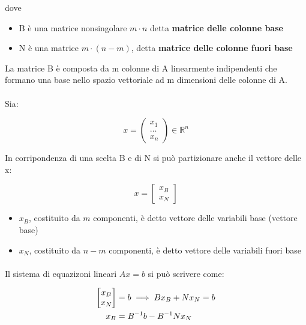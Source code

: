 \documentclass[a4paper, 11pt]{article}
\begin{document}
        dove 
        \begin{itemize}
            \item B è una matrice nonsingolare $m \cdot n$ detta \textbf{matrice delle colonne base}
            \item N è una matrice $m \cdot (n-m)$, detta \textbf{matrice delle colonne fuori base}
        \end{itemize}

        La matrice B è composta da m colonne di A linearmente indipendenti che formano 
        una base nello spazio vettoriale ad m dimensioni delle colonne di A.



        \paragraph{}
        Sia:


        \[
            x = 
            \begin{pmatrix}
                x_1 \\
                \ldots \\
                x_n
            \end{pmatrix}
            \in \mathbb{R}^n
        \]

        In corripondenza di una scelta B e di N si può partizionare anche il vettore delle x:

        \[ x = 
        \begin{bmatrix}
            x_B \\
            x_N
        \end{bmatrix}
        \]

        \begin{itemize}
            \item $x_B$, costituito da $m$ componenti, è detto vettore delle variabili base (vettore base)
            \item $x_N$, costituito da $n-m$ componenti, è detto vettore delle variabili fuori base
        \end{itemize}



        \paragraph{}
        Il sistema di equazizoni lineari $Ax = b$ si può scrivere come:
        
        \begin{align}
            [B|N] 
            \begin{bmatrix}
                x_B \\
                x_N 
            \end{bmatrix} &= b
            \implies B x_B + N x_N = b \notag \\
            x_B &= B^{-1} b -B^{-1} N x_N \notag 
        \end{align}
\end{document}
